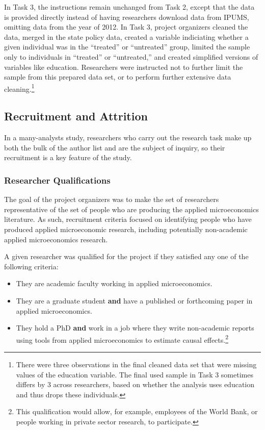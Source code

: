 \documentclass[
  letterpaper,
  DIV=11,
  numbers=noendperiod]{scrartcl}
\begin{document}
In Task 3, the instructions remain unchanged from Task 2, except that
the data is provided directly instead of having researchers download
data from IPUMS, omitting data from the year of 2012. In Task 3, project
organizers cleaned the data, merged in the state policy data, created a
variable indiciating whether a given individual was in the ``treated''
or ``untreated'' group, limited the sample only to individuals in
``treated'' or ``untreated,'' and created simplified versions of
variables like education. Researchers were instructed not to further
limit the sample from this prepared data set, or to perform further
extensive data cleaning.\footnote{There were three observations in the
  final cleaned data set that were missing values of the education
  variable. The final used sample in Task 3 sometimes differs by 3
  across researchers, based on whether the analysis uses education and
  thus drops these individuals.}

\hypertarget{recruitment-and-attrition}{%
\subsection{Recruitment and Attrition}\label{recruitment-and-attrition}}

In a many-analysts study, researchers who carry out the research task
make up both the bulk of the author list and are the subject of inquiry,
so their recruitment is a key feature of the study.

\hypertarget{researcher-qualifications}{%
\subsubsection{Researcher
Qualifications}\label{researcher-qualifications}}

The goal of the project organizers was to make the set of researchers
representative of the set of people who are producing the applied
microeconomics literature. As such, recruitment criteria focused on
identifying people who have produced applied microeconomic research,
including potentially non-academic applied microeconomics research.

A given researcher was qualified for the project if they satisfied any
one of the following criteria:

\begin{itemize}
\item
  They are academic faculty working in applied microeconomics.
\item
  They are a graduate student \textbf{and} have a published or
  forthcoming paper in applied microeconomics.
\item
  They hold a PhD \textbf{and} work in a job where they write
  non-academic reports using tools from applied microeconomics to
  estimate causal effects.\footnote{This qualification would allow, for
    example, employees of the World Bank, or people working in private
    sector research, to participate.}
\end{itemize}
\end{document}
